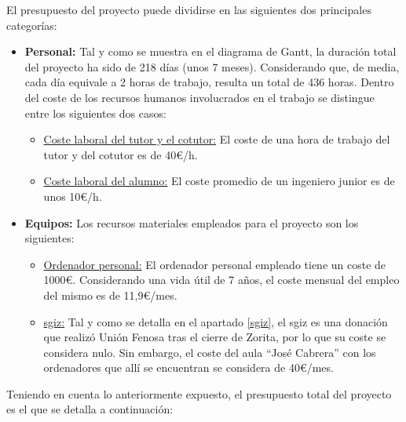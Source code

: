     El presupuesto del proyecto puede dividirse en las siguientes dos principales categorías:

    \begin{itemize}
      \item \textbf{Personal:} Tal y como se muestra en el diagrama de Gantt, la duración total del proyecto ha sido de 218 días (unos 7 meses). Considerando que, de media, cada día equivale a 2 horas de trabajo, resulta un total de 436 horas. Dentro del coste de los recursos humanos involucrados en el trabajo se distingue entre los siguientes dos casos:
      \begin{itemize}
        \item \underline{Coste laboral del tutor y el cotutor:} El coste de una hora de trabajo del tutor y del cotutor es de 40€/h.
        \item \underline{Coste laboral del alumno:} El coste promedio de un ingeniero junior es de unos 10€/h.
      \end{itemize} 
      \item \textbf{Equipos:} Los recursos materiales empleados para el proyecto son los siguientes:
      \begin{itemize}
        \item \underline{Ordenador personal:} El ordenador personal empleado tiene un coste de 1000€. Considerando una vida útil de 7 años, el coste mensual del empleo del mismo es de 11,9€/mes.
        \item \underline{\acrfull{sgiz}:} Tal y como se detalla en el apartado \ref{sgiz}, el \acrshort{sgiz} es una donación que realizó Unión Fenosa tras el cierre de Zorita, por lo que su coste se considera nulo. Sin embargo, el coste del aula ``José Cabrera'' con los ordenadores que allí se encuentran se considera de 40€/mes.
      \end{itemize}
    \end{itemize}
    
    Teniendo en cuenta lo anteriormente expuesto, el presupuesto total del proyecto es el que se detalla a continuación:
    
